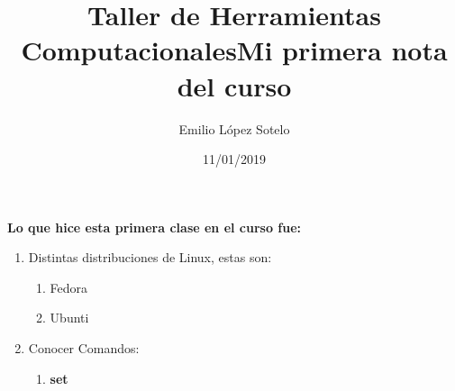 \documentclass[letterpaper, 12pt, oneside]{article}%
\title{\Huge Taller de Herramientas Computacionales}
\author{Emilio López Sotelo}
\date{11/01/2019}
\begin{document}
	
	\maketitle
	\newpage
	
	\title{\Huge Mi primera nota del curso\\}
	
	\textbf{Lo que hice esta primera clase en el curso fue:}
	
	\begin{enumerate}
		\item Distintas distribuciones de Linux, estas son:
		\begin{enumerate}
			\item Fedora
			\item Ubunti
			\end{enumerate}
		\item Conocer Comandos:
		\begin{enumerate}
			\item \color{blue}\textbf{set}
		\end{enumerate}
	\end{enumerate}
\end{document}
